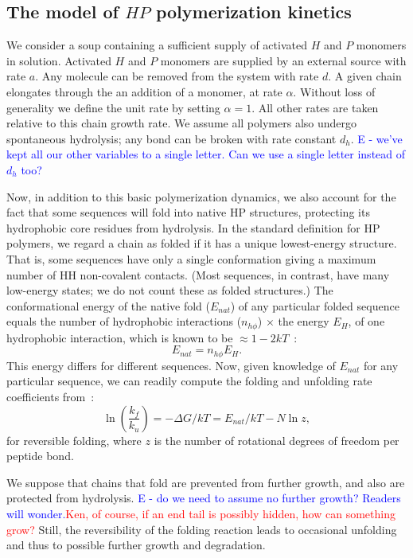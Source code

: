 \documentclass[journal=jacsat,manuscript=article,layout=twocolumn]{achemso}
\newcommand*{\ga}{\alpha}
\newcommand*{\gD}{\Delta}
\newcommand*{\pt}[1]{\left( #1\right)}
\newcommand*{\red}[1]{\textcolor{red}{#1}}
\newcommand*{\blue}[1]{\textcolor{blue}{#1}}
\begin{document}
\subsection{The model of $HP$ polymerization kinetics}

 We consider a soup containing a sufficient supply of activated $H$ and $P$ monomers in solution.  
 Activated $H$ and $P$ monomers are supplied by an external source with rate $a$.  Any molecule can 
be removed from the system with rate $d$.  A given chain elongates through the 
an addition of a monomer, at rate $\ga$. Without loss of 
generality we define the unit rate by setting $\ga = 1$.  All other rates are taken relative to 
this 
chain growth rate.  We assume all polymers also undergo spontaneous hydrolysis; any bond can be 
broken with rate constant $d_h$.  \blue{E - we've kept all our other variables to a single letter.  
Can 
we use a single letter instead of $d_h$ too?}

 Now, in addition to this basic polymerization dynamics, we also account for the fact that some 
sequences 
will fold into native HP structures, protecting its hydrophobic core residues from hydrolysis.  In 
the standard definition for HP polymers, we regard a chain as folded if it has a unique 
lowest-energy structure.  That is, some sequences have only a single conformation giving a maximum 
number of HH non-covalent contacts.  (Most sequences, in contrast, 
have many low-energy states; we do not count these as folded structures.)  
The conformational energy of the native fold ($E_{nat}$) of any particular folded sequence equals 
the number of hydrophobic interactions ($n_{h\phi}$) $\times$ the energy $E_H$, of one hydrophobic 
interaction, which is known to be $\approx 1-2kT$~\cite{Ghosh2009}:
\begin{equation}
 E_{nat}=n_{h\phi}E_H.
\end{equation} 
This energy differs for different sequences.  Now, given knowledge of $E_{nat}$ for any particular 
sequence, we can readily compute the folding and unfolding rate coefficients from~\cite{Ghosh2009}:
\begin{equation}
 \ln\pt{\frac{k_f}{k_u}}=-\gD G/kT = E_{nat}/kT-N\ln z,
\end{equation} 
for reversible folding, where $z$ is the number of rotational degrees of freedom per peptide bond.  

We suppose that chains that fold are prevented from further growth, and also are protected from 
hydrolysis.  
\blue{E - do we need to assume no further growth?  Readers will wonder.}\red{Ken, of course, if an 
end tail is possibly hidden, how can something grow?}  Still, the reversibility of the folding 
reaction leads to occasional unfolding and thus to possible further growth and degradation.
 
\end{document}
